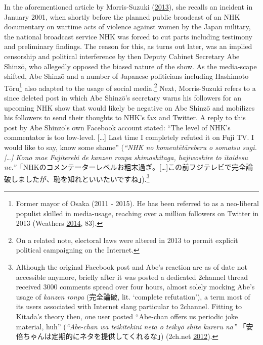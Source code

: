 \documentclass[10pt,british,A4paper,twoside]{memoir}
\begin{document}
In the aforementioned article by Morris-Suzuki
(\protect\hyperlink{ref-morris-suzuki_freedom_2013}{2013}), she recalls
an incident in January 2001, when shortly before the planned public
broadcast of an NHK documentary on wartime acts of violence against
women by the Japan military, the national broadcast service NHK was
forced to cut parts including testimony and preliminary findings. The
reason for this, as turns out later, was an implied censorship and
political interference by then Deputy Cabinet Secretary Abe Shinzō, who
allegedly opposed the biased nature of the show. As the media-scape
shifted, Abe Shinzō and a number of Japanese politicians including
Hashimoto Tōru\footnote{Former mayor of Osaka (2011 - 2015). He has been
  referred to as a neo-liberal populist skilled in media-usage, reaching
  over a million followers on Twitter in 2013 (Weathers
  \protect\hyperlink{ref-weathers_reformer_2014}{2014}, 83).} also
adapted to the usage of social media.\footnote{On a related note,
  electoral laws were altered in 2013 to permit explicit political
  campaigning on the Internet.} Next, Morris-Suzuki refers to a since
deleted post in which Abe Shinzō's secretary warns his followers for an
upcoming NHK show that would likely be negative on Abe Shinzō and
mobilizes his followers to send their thoughts to NHK's fax and Twitter.
A reply to this post by Abe Shinzō's own Facebook account stated: ``The
level of NHK's commentator is too low-level. {[}\ldots{}{]} Last time I
completely refuted it on Fuji TV. I would like to say, know some shame''
(\emph{``NHK no komentētāreberu o somatsu sugi.{[}\ldots{}{]} Kono mae
Fujiterebi de kanzen ronpa shimashitaga, hajiwoshire to ītaidesu
ne.''}「NHKのコメンテーターレベルお粗末過ぎ。{[}\ldots{}{]}この前フジテレビで完全論破しましたが、恥を知れといいたいですね」).\footnote{Although
  the original Facebook post and Abe's reaction are as of date not
  accessible anymore, briefly after it was posted a dedicated 2channel
  thread received 3000 comments spread over four hours, almost solely
  mocking Abe's usage of \emph{kanzen ronpa} (完全論破, lit. `complete
  refutation'), a term most of its users associated with Internet slang
  particular to 2channel. Fitting to Kitada's theory then, one user
  posted ``Abe-chan offers us periodic joke material, huh''
  (\emph{``Abe-chan wa teikitekini neta o teikyō shite kureru na''}
  「安倍ちゃんは定期的にネタを提供してくれるな」) (2ch.net
  \protect\hyperlink{ref-2ch.net_eng._2012}{2012}).}
\end{document}
